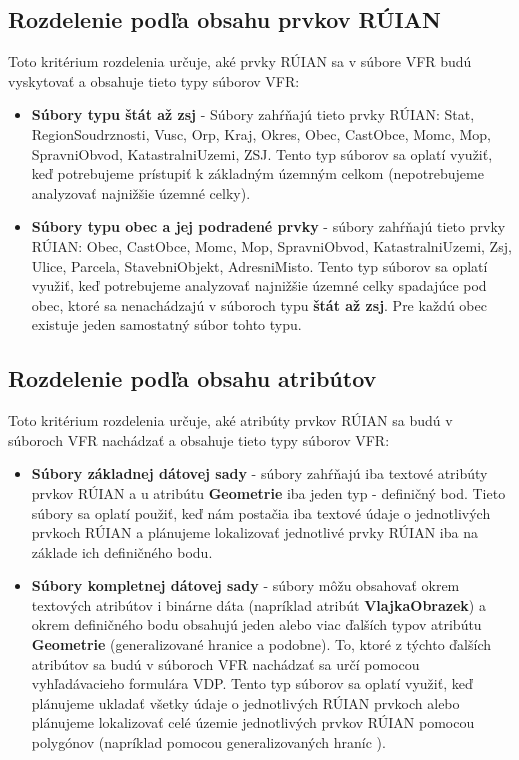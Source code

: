 \subsection {Rozdelenie podľa obsahu prvkov RÚIAN}
Toto kritérium rozdelenia určuje, aké prvky RÚIAN sa v súbore VFR budú vyskytovať a obsahuje tieto typy súborov VFR:
\begin{itemize}
\item{{\bf Súbory typu štát až zsj} - Súbory zahŕňajú tieto prvky RÚIAN: Stat, RegionSoudrznosti, Vusc, Orp, Kraj, Okres, Obec, CastObce, Momc, Mop, SpravniObvod, KatastralniUzemi, ZSJ. Tento typ súborov sa oplatí využiť, keď potrebujeme prístupiť k základným územným celkom (nepotrebujeme analyzovať najnižšie územné celky).}
\item{{\bf Súbory typu obec a jej podradené prvky} - súbory zahŕňajú tieto prvky RÚIAN: Obec, CastObce, Momc, Mop, SpravniObvod, KatastralniUzemi, Zsj, Ulice, Parcela, StavebniObjekt, AdresniMisto. Tento typ súborov sa oplatí využiť, keď potrebujeme analyzovať najnižšie územné celky spadajúce pod obec, ktoré sa nenachádzajú v súboroch typu {\bf štát až zsj}. Pre každú obec existuje jeden samostatný súbor tohto typu.}
\end{itemize}

\subsection {Rozdelenie podľa obsahu atribútov}
Toto kritérium rozdelenia určuje, aké atribúty prvkov RÚIAN sa budú v súboroch VFR nachádzať a obsahuje tieto typy súborov VFR:
\begin{itemize}
\item{{\bf Súbory základnej dátovej sady} - súbory zahŕňajú iba textové atribúty prvkov RÚIAN a u atribútu {\bf Geometrie} iba  jeden typ - definičný bod. Tieto súbory sa oplatí použiť, keď nám postačia iba textové údaje o jednotlivých prvkoch RÚIAN a plánujeme lokalizovať jednotlivé prvky RÚIAN iba na základe ich definičného bodu.}
\item{{\bf Súbory kompletnej dátovej sady} - súbory môžu obsahovať okrem textových atribútov i binárne dáta (napríklad atribút {\bf VlajkaObrazek}) a okrem definičného bodu obsahujú jeden alebo viac ďalších typov atribútu {\bf Geometrie} (generalizované hranice a podobne). To, ktoré z týchto ďalších atribútov sa budú v súboroch VFR nachádzať sa určí pomocou vyhľadávacieho formulára VDP. Tento typ súborov sa oplatí využiť, keď plánujeme ukladať všetky údaje o jednotlivých RÚIAN prvkoch alebo plánujeme lokalizovať celé územie jednotlivých prvkov RÚIAN pomocou polygónov (napríklad pomocou generalizovaných hraníc )}. 
\end{itemize}

